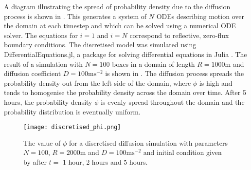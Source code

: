 %
A diagram illustrating the spread of probability density due to the diffusion process is shown in .  This generates a system of $N$ ODEs describing motion over
the domain at each timestep and which can be solved using a numerical ODE solver.
The equations for $i=1$ and $i=N$ correspond to reflective, zero-flux boundary
conditions. The discretised model was simulated using DifferentialEquations.jl, a package for solving differential equations in Julia \cite{DifferentialEquations}. The result of a simulation with $N = 100$ boxes in a domain of
length $R = 1000$m and diffusion coefficient $D = 100\mathrm{ms^{-2}}$ is shown in
. The diffusion process spreads the probability density out from the left side of the domain, where $\phi$ is high and tends to homogenise the probability density across the domain over time. After 5 hours, the probability density $\phi$ is evenly spread throughout the domain and the probability distribution is eventually uniform.

 \begin{figure} [t]
     \centering
         \texttt{[image: discretised\_phi.png]}
         \caption{The value of $\phi$ for a discretised diffusion simulation with parameters $N = 100$, $R = 2000\mathrm{m}$ and $D = 100\mathrm{ms^{-2}}$ and initial condition given by  after $t = $ 1 hour, 2 hours and 5 hours.}
     \label{fig:discretised_phi}
 \end{figure}
